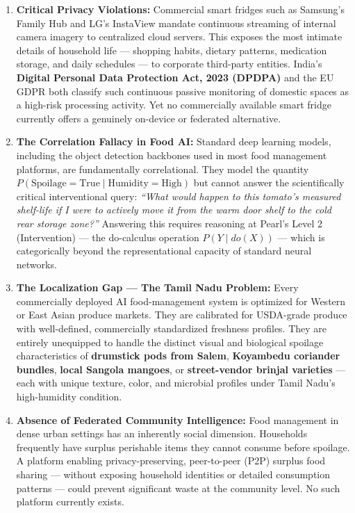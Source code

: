 \documentclass[12pt,a4paper]{report}
\begin{document}
\begin{enumerate}[leftmargin=2em, itemsep=0.3em]

\item \textbf{Critical Privacy Violations:} Commercial smart fridges such as Samsung's Family Hub and LG's InstaView mandate continuous streaming of internal camera imagery to centralized cloud servers. This exposes the most intimate details of household life — shopping habits, dietary patterns, medication storage, and daily schedules — to corporate third-party entities. India's \textbf{Digital Personal Data Protection Act, 2023 (DPDPA)} and the EU GDPR both classify such continuous passive monitoring of domestic spaces as a high-risk processing activity. Yet no commercially available smart fridge currently offers a genuinely on-device or federated alternative.

\item \textbf{The Correlation Fallacy in Food AI:} Standard deep learning models, including the object detection backbones used in most food management platforms, are fundamentally correlational. They model the quantity $P(\text{Spoilage} = \text{True} \mid \text{Humidity} = \text{High})$ but cannot answer the scientifically critical interventional query: \textit{``What would happen to this tomato's measured shelf-life if I were to actively move it from the warm door shelf to the cold rear storage zone?''} Answering this requires reasoning at Pearl's Level 2 (Intervention) — the do-calculus operation $P(Y \mid do(X))$ — which is categorically beyond the representational capacity of standard neural networks.

\item \textbf{The Localization Gap — The Tamil Nadu Problem:} Every commercially deployed AI food-management system is optimized for Western or East Asian produce markets. They are calibrated for USDA-grade produce with well-defined, commercially standardized freshness profiles. They are entirely unequipped to handle the distinct visual and biological spoilage characteristics of \textbf{drumstick pods from Salem}, \textbf{Koyambedu coriander bundles}, \textbf{local Sangola mangoes}, or \textbf{street-vendor brinjal varieties} — each with unique texture, color, and microbial profiles under Tamil Nadu's high-humidity condition.

\item \textbf{Absence of Federated Community Intelligence:} Food management in dense urban settings has an inherently social dimension. Households frequently have surplus perishable items they cannot consume before spoilage. A platform enabling privacy-preserving, peer-to-peer (P2P) surplus food sharing — without exposing household identities or detailed consumption patterns — could prevent significant waste at the community level. No such platform currently exists.


\end{enumerate}
\end{document}
